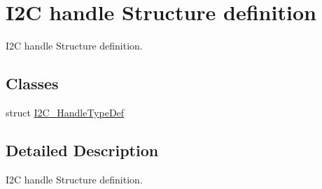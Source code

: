 \hypertarget{group___i2_c__handle___structure__definition}{\section{I2\-C handle Structure definition}
\label{group___i2_c__handle___structure__definition}
}


I2\-C handle Structure definition.  


\subsection*{Classes}
\begin{DoxyCompactItemize}
\item 
struct \hyperlink{struct_i2_c___handle_type_def}{I2\-C\-\_\-\-Handle\-Type\-Def}
\end{DoxyCompactItemize}


\subsection{Detailed Description}
I2\-C handle Structure definition. 